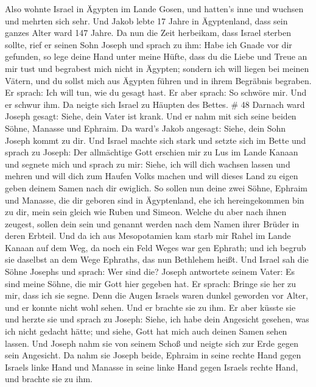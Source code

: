  Also wohnte Israel in Ägypten im Lande Gosen, und hatten's
inne und wuchsen und mehrten sich sehr.  Und Jakob lebte 17
Jahre in Ägyptenland, dass sein ganzes Alter ward 147 Jahre.
 Da nun die Zeit herbeikam, dass Israel sterben sollte,
rief er seinen Sohn Joseph und sprach zu ihm: Habe ich Gnade vor dir
gefunden, so lege deine Hand unter meine Hüfte, dass du die Liebe und
Treue an mir tust und begrabest mich nicht in Ägypten; 
sondern ich will liegen bei meinen Vätern, und du sollst mich aus
Ägypten führen und in ihrem Begräbnis begraben. Er sprach: Ich will tun,
wie du gesagt hast.  Er aber sprach: So schwöre mir. Und er
schwur ihm. Da neigte sich Israel zu Häupten des Bettes. \# 48
 Darnach ward Joseph gesagt: Siehe, dein Vater ist krank.
Und er nahm mit sich seine beiden Söhne, Manasse und Ephraim.
 Da ward's Jakob angesagt: Siehe, dein Sohn Joseph kommt zu
dir. Und Israel machte sich stark und setzte sich im Bette 
und sprach zu Joseph: Der allmächtige Gott erschien mir zu Lus im Lande
Kanaan und segnete mich  und sprach zu mir: Siehe, ich will
dich wachsen lassen und mehren und will dich zum Haufen Volks machen und
will dieses Land zu eigen geben deinem Samen nach dir ewiglich.
 So sollen nun deine zwei Söhne, Ephraim und Manasse, die
dir geboren sind in Ägyptenland, ehe ich hereingekommen bin zu dir, mein
sein gleich wie Ruben und Simeon.  Welche du aber nach ihnen
zeugest, sollen dein sein und genannt werden nach dem Namen ihrer Brüder
in deren Erbteil.  Und da ich aus Mesopotamien kam starb mir
Rahel im Lande Kanaan auf dem Weg, da noch ein Feld Weges war gen
Ephrath; und ich begrub sie daselbst an dem Wege Ephraths, das nun
Bethlehem heißt.  Und Israel sah die Söhne Josephs und
sprach: Wer sind die?  Joseph antwortete seinem Vater: Es
sind meine Söhne, die mir Gott hier gegeben hat. Er sprach: Bringe sie
her zu mir, dass ich sie segne.  Denn die Augen Israels
waren dunkel geworden vor Alter, und er konnte nicht wohl sehen. Und er
brachte sie zu ihm. Er aber küsste sie und herzte sie  und
sprach zu Joseph: Siehe, ich habe dein Angesicht gesehen, was ich nicht
gedacht hätte; und siehe, Gott hat mich auch deinen Samen sehen lassen.
 Und Joseph nahm sie von seinem Schoß und neigte sich zur
Erde gegen sein Angesicht.  Da nahm sie Joseph beide,
Ephraim in seine rechte Hand gegen Israels linke Hand und Manasse in
seine linke Hand gegen Israels rechte Hand, und brachte sie zu ihm.
